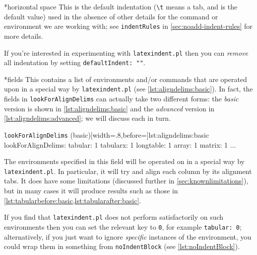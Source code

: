 
*{horizontal space}
	This is the default indentation (\lstinline!\t! means a tab, and is the default
	value) used in the absence of other details for the command or environment we are working
	with; see \texttt{indentRules} in \vref{sec:noadd-indent-rules} for more details.

	If you're interested in experimenting with \texttt{latexindent.pl} then you can
	\emph{remove} all indentation by setting \texttt{defaultIndent: ""}.

*{fields}
	This contains a list of environments and/or commands that are operated upon in a special
	way by \texttt{latexindent.pl} (see \cref{lst:aligndelims:basic}). In fact, the fields in \texttt{lookForAlignDelims} can
	actually take two different forms: the \emph{basic} version is shown in
	\cref{lst:aligndelims:basic} and the \emph{advanced} version in
	\cref{lst:aligndelims:advanced}; we will discuss each in turn.

	\begin{yaml}[numbers=none]{\texttt{lookForAlignDelims} (basic)}[width=.8\linewidth,before=\centering]{lst:aligndelims:basic}
lookForAlignDelims:
   tabular: 1
   tabularx: 1
   longtable: 1
   array: 1
   matrix: 1
   ...
	\end{yaml}

	The environments specified in this field will be operated on in a special way by
	\texttt{latexindent.pl}. In particular, it will try and align each column by its
	alignment tabs. It does have some limitations (discussed further in
	\cref{sec:knownlimitations}), but in many cases it will produce results such as those in
	\cref{lst:tabularbefore:basic,lst:tabularafter:basic}.

	If you find that \texttt{latexindent.pl} does not perform satisfactorily on such
	environments then you can set the relevant key to \texttt{0}, for example
	\texttt{tabular: 0}; alternatively, if you just want to ignore
	\emph{specific} instances of the environment, you could wrap them in something
	from \texttt{noIndentBlock} (see \vref{lst:noIndentBlock}).

	\begin{cmhtcbraster}
	\end{cmhtcbraster}


